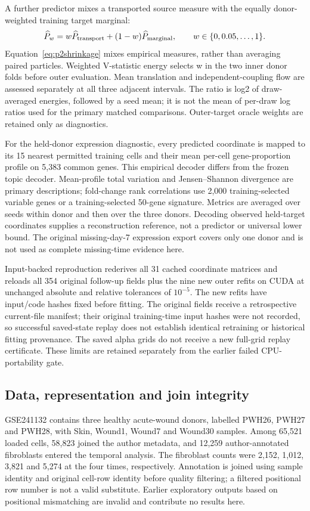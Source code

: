 \documentclass[10pt,a4paper]{article}
\begin{document}
A further predictor mixes a transported source measure with the equally donor-weighted training target marginal:
\begin{equation}
\widehat P_w=w\widehat P_{\rm transport}+(1-w)\widehat P_{\rm marginal},\qquad w\in\{0,0.05,\ldots,1\}.\label{eq:p2shrinkage}
\end{equation}
Equation~\eqref{eq:p2shrinkage} mixes empirical measures, rather than averaging paired particles. Weighted V-statistic energy selects w in the two inner donor folds before outer evaluation. Mean translation and independent-coupling flow are assessed separately at all three adjacent intervals. The ratio is log2 of draw-averaged energies, followed by a seed mean; it is not the mean of per-draw log ratios used for the primary matched comparisons. Outer-target oracle weights are retained only as diagnostics.

For the held-donor expression diagnostic, every predicted coordinate is mapped to its 15 nearest permitted training cells and their mean per-cell gene-proportion profile on 5,383 common genes. This empirical decoder differs from the frozen topic decoder. Mean-profile total variation and Jensen--Shannon divergence are primary descriptions; fold-change rank correlations use 2,000 training-selected variable genes or a training-selected 50-gene signature. Metrics are averaged over seeds within donor and then over the three donors. Decoding observed held-target coordinates supplies a reconstruction reference, not a predictor or universal lower bound. The original missing-day-7 expression export covers only one donor and is not used as complete missing-time evidence here.

Input-backed reproduction rederives all 31 cached coordinate matrices and reloads all 354 original follow-up fields plus the nine new outer refits on CUDA at unchanged absolute and relative tolerances of $10^{-5}$. The new refits have input/code hashes fixed before fitting. The original fields receive a retrospective current-file manifest; their original training-time input hashes were not recorded, so successful saved-state replay does not establish identical retraining or historical fitting provenance. The saved alpha grids do not receive a new full-grid replay certificate. These limits are retained separately from the earlier failed CPU-portability gate.

\subsection{Data, representation and join integrity}
GSE241132 contains three healthy acute-wound donors, labelled PWH26, PWH27 and PWH28, with Skin, Wound1, Wound7 and Wound30 samples. Among 65,521 loaded cells, 58,823 joined the author metadata, and 12,259 author-annotated fibroblasts entered the temporal analysis. The fibroblast counts were 2,152, 1,012, 3,821 and 5,274 at the four times, respectively. Annotation is joined using sample identity and original cell-row identity before quality filtering; a filtered positional row number is not a valid substitute. Earlier exploratory outputs based on positional mismatching are invalid and contribute no results here.
\end{document}
